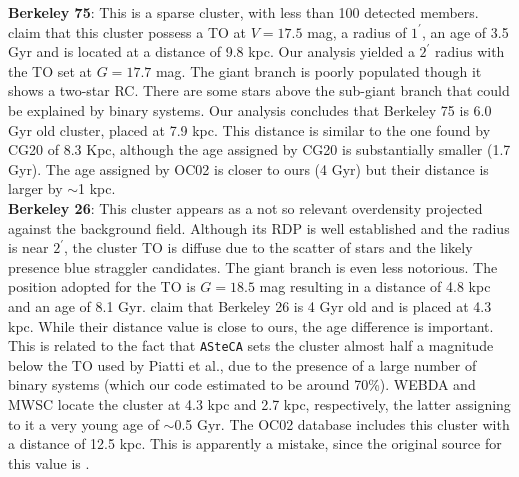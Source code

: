 \documentclass{aa}
\begin{document}
  \textbf{Berkeley 75}: This is a sparse cluster, with less than 100 detected
  members. \cite{Carraro_2005} claim that this cluster possess
  a TO at $V= 17.5$ mag, a radius of $1^{\prime}$, an age of 3.5 Gyr and is
  located at a distance of 9.8 kpc.
  Our analysis yielded a $2^{\prime}$ radius with the TO set at $G=17.7$ mag.
  The giant branch is poorly populated though it shows a two-star RC.
  There are some stars above the sub-giant branch that could be explained
  by binary systems. Our analysis concludes that Berkeley 75 is 6.0 Gyr old
  cluster, placed at 7.9 kpc. This distance is similar to the one found by CG20
  of 8.3 Kpc, although the age assigned by CG20 is substantially smaller (1.7
  Gyr). The age assigned by OC02 is closer to ours (4 Gyr) but their distance is
  larger by $\sim$1 kpc.\\

  \textbf{Berkeley 26}: This cluster appears as a not so relevant overdensity
  projected against the background field. Although its RDP is well established
  and the radius is near $2^{\prime}$, the cluster TO is diffuse due to the
  scatter of stars and the likely presence blue straggler candidates. The
  giant branch is even less notorious.
  The position adopted for the TO is $G=18.5$ mag resulting in a distance of 4.8
  kpc and an age of 8.1 Gyr. \cite{Piatti_2010} claim that Berkeley 26 is 4 Gyr
  old and is placed at 4.3 kpc. While their distance value is close to ours, the
  age difference is important. This is related to the fact that \texttt{ASteCA}
  sets the cluster almost half a magnitude below the TO used by Piatti et al.,
  due to the presence of a large number of binary systems (which our code
  estimated to be around 70\%).
  WEBDA and MWSC locate the cluster at 4.3 kpc and 2.7 kpc, respectively, the
  latter assigning to it a very young age of $\sim$0.5 Gyr. The OC02 database
  includes this cluster with a distance of 12.5 kpc. This is apparently
  a mistake, since the original source for this value is \cite{Piatti_2010}.\\
\end{document}
